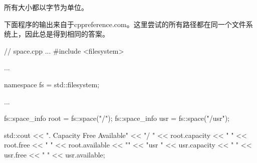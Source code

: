 所有大小都以字节为单位。

下面程序的输出来自于cppreference.com。这里尝试的所有路径都在同一个文件系统上，因此总是得到相同的答案。


\begin{cpp}
// space.cpp
...
#include <filesystem>

...

namespace fs = std::filesystem;

...

fs::space_info root = fs::space("/");
fs::space_info usr = fs::space("/usr");

std::cout << ". Capacity Free Available\n"
		  << "/ " << root.capacity << " "
		  << root.free << " " << root.available << "\n"
		  << "usr " << usr.capacity << " "
		  << usr.free << " " << usr.available;
\end{cpp}













